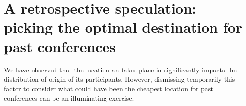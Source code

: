 








\section{A retrospective speculation: picking the optimal destination for past conferences}
\label{sec:speculate}

We have observed that the location an \event takes place in significantly
impacts the distribution of origin of its participants. However, dismissing
temporarily this factor to consider what could have been the cheapest location
for past conferences can be an illuminating exercise.

